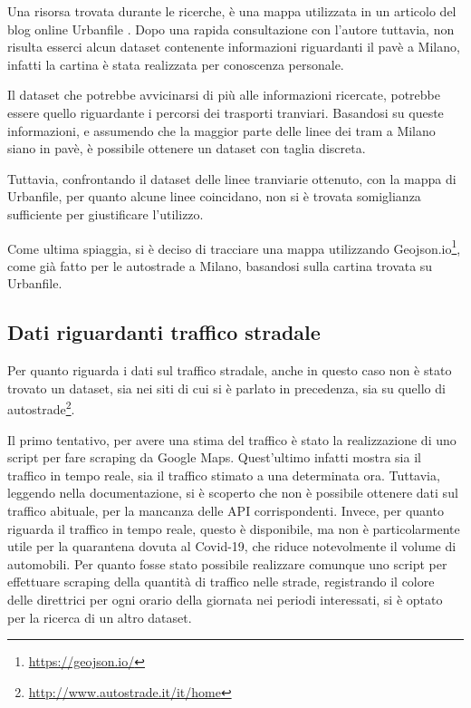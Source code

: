 \documentclass[a4paper,12pt]{report}
\begin{document}
Una risorsa trovata durante le ricerche, è una mappa utilizzata in un articolo del blog online 
Urbanfile \cite{URBANFILE:1}. 
Dopo una rapida consultazione con l'autore tuttavia, non risulta esserci alcun 
dataset contenente informazioni riguardanti il pavè a Milano, infatti la cartina è 
stata realizzata per conoscenza personale.

Il dataset che potrebbe avvicinarsi di più alle informazioni ricercate, 
potrebbe essere quello riguardante i percorsi dei trasporti tranviari. 
Basandosi su queste informazioni, e assumendo che la maggior parte delle linee dei 
tram a Milano siano in pavè, è possibile ottenere un dataset con taglia discreta.

Tuttavia, confrontando il dataset delle linee tranviarie ottenuto, 
con la mappa di Urbanfile, per quanto alcune linee coincidano, non si è trovata 
somiglianza sufficiente per giustificare l'utilizzo.

Come ultima spiaggia, si è deciso di tracciare una mappa utilizzando 
Geojson.io\footnote{\url{https://geojson.io/}}, come già fatto per le autostrade a Milano, 
basandosi sulla cartina trovata su Urbanfile. 

\subsection{Dati riguardanti traffico stradale}

Per quanto riguarda i dati sul traffico stradale, anche in questo caso non è stato trovato un 
dataset, sia nei siti di cui si è parlato in precedenza, sia su quello di 
autostrade\footnote{\url{http://www.autostrade.it/it/home}}.

Il primo tentativo, per avere una stima del traffico è stato la realizzazione di uno 
script per fare scraping da Google Maps. 
Quest'ultimo infatti mostra sia il traffico in tempo reale, sia 
il traffico stimato a una determinata ora. 
Tuttavia, leggendo nella documentazione, si è scoperto che non è possibile ottenere 
dati sul traffico abituale, per la mancanza delle API corrispondenti. 
Invece, per quanto riguarda il traffico in tempo 
reale, questo è disponibile, ma non è particolarmente utile per la quarantena dovuta al 
Covid-19, che riduce notevolmente il volume di automobili. 
Per quanto fosse stato possibile realizzare comunque uno script per effettuare scraping della 
quantità di traffico nelle strade, registrando il colore delle direttrici per ogni orario della 
giornata nei periodi interessati, si è optato per la ricerca di un altro dataset.
\end{document}

